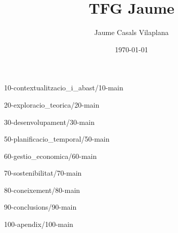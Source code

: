\documentclass[a4paper, 12pt]{report}
\title{TFG Jaume}
\author{Jaume Casals Vilaplana}
\date{\today}
\begin{document}

\clearpage


\clearpage


\clearpage

{10-contextualitzacio_i_abast/10-main}
\clearpage

{20-exploracio_teorica/20-main}
\clearpage

{30-desenvolupament/30-main}
\clearpage


{50-planificacio_temporal/50-main}
\clearpage

{60-gestio_economica/60-main}
\clearpage

{70-sostenibilitat/70-main}
\clearpage

{80-coneixement/80-main}
\clearpage

{90-conclusions/90-main}
\clearpage

{100-apendix/100-main}
\clearpage

\appendix

\printbibliography[title={Referències}]

\afterpage{\null\newpage}
\end{document}
